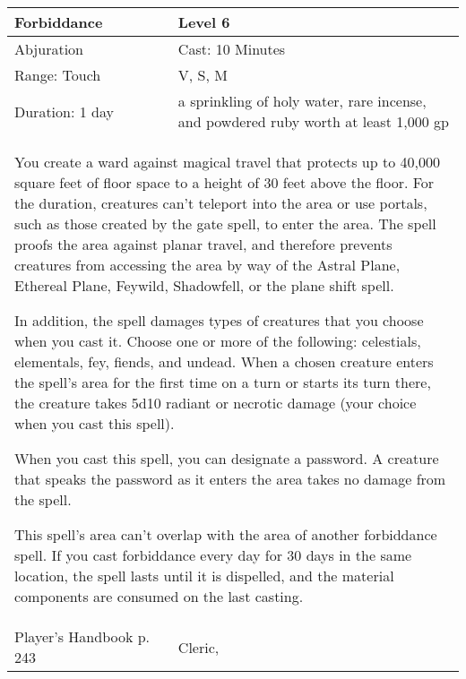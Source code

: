 \documentclass[11pt]{report}
\begin{document}
\begin{table}[H]
	\begin{tabular}{||p{6cm}|p{6cm}||}
		\hline\hline
		\bf{Forbiddance} & Level 6\\ \hline
		Abjuration & Cast: 10 Minutes\\ \hline
		Range: Touch & V, S, M\\ \hline
		Duration: 1 day & a sprinkling of holy water, rare incense, and powdered ruby worth at least 1,000 gp\\ \hline
		\multicolumn{2}{||p{12cm}||}{You create a ward against magical travel that protects up to 40,000 square feet of floor space to a height of 30 feet above the floor. For the duration, creatures can’t teleport into the area or use portals, such as those created by the gate spell, to enter the area. The spell proofs the area against planar travel, and therefore prevents creatures from accessing the area by way of the Astral Plane, Ethereal Plane, Feywild, Shadowfell, or the plane shift spell.

In addition, the spell damages types of creatures that you choose when you cast it. Choose one or more of the following: celestials, elementals, fey, fiends, and undead. When a chosen creature enters the spell’s area for the first time on a turn or starts its turn there, the creature takes 5d10 radiant or necrotic damage (your choice when you cast this spell).

When you cast this spell, you can designate a password. A creature that speaks the password as it enters the area takes no damage from the spell.

This spell’s area can’t overlap with the area of another forbiddance spell. If you cast forbiddance every day for 30 days in the same location, the spell lasts until it is dispelled, and the material components are consumed on the last casting.}\\ \hline
Player's Handbook p. 243 & Cleric, \\ \hline\hline
	\end{tabular}
\end{table}
\end{document}
